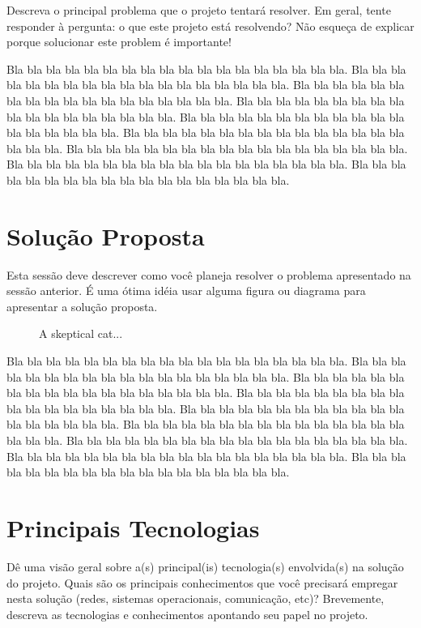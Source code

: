 \documentclass{acm_proc_article-sp}
\newcommand{\fig}[4][htb]{
  \begin{figure}[#1]
    {\centering{\texttt{[image: fig/\#2]}}\par}
    \caption{#3}
    \label{fig:#2}
  \end{figure}
}
\begin{document}
Descreva o principal problema que o projeto tentará resolver.
Em geral, tente responder à pergunta: o que este projeto está resolvendo?
Não esqueça de explicar porque solucionar este problem é importante!

Bla bla bla bla bla bla bla bla bla bla bla bla bla bla bla bla bla bla.
Bla bla bla bla bla bla bla bla bla bla bla bla bla bla bla bla bla bla.
Bla bla bla bla bla bla bla bla bla bla bla bla bla bla bla bla bla bla.
Bla bla bla bla bla bla bla bla bla bla bla bla bla bla bla bla bla bla.
Bla bla bla bla bla bla bla bla bla bla bla bla bla bla bla bla bla bla.
Bla bla bla bla bla bla bla bla bla bla bla bla bla bla bla bla bla bla.
Bla bla bla bla bla bla bla bla bla bla bla bla bla bla bla bla bla bla.
Bla bla bla bla bla bla bla bla bla bla bla bla bla bla bla bla bla bla.
Bla bla bla bla bla bla bla bla bla bla bla bla bla bla bla bla bla bla.

\section{Solução Proposta}

Esta sessão deve descrever como você planeja resolver o problema apresentado na sessão anterior.
É uma ótima idéia usar alguma figura ou diagrama para apresentar a solução proposta.

\fig{cat}{A skeptical cat...}{width=0.8\columnwidth}

Bla bla bla bla bla bla bla bla bla bla bla bla bla bla bla bla bla bla.
Bla bla bla bla bla bla bla bla bla bla bla bla bla bla bla bla bla bla.
Bla bla bla bla bla bla bla bla bla bla bla bla bla bla bla bla bla bla.
Bla bla bla bla bla bla bla bla bla bla bla bla bla bla bla bla bla bla.
Bla bla bla bla bla bla bla bla bla bla bla bla bla bla bla bla bla bla.
Bla bla bla bla bla bla bla bla bla bla bla bla bla bla bla bla bla bla.
Bla bla bla bla bla bla bla bla bla bla bla bla bla bla bla bla bla bla.
Bla bla bla bla bla bla bla bla bla bla bla bla bla bla bla bla bla bla.
Bla bla bla bla bla bla bla bla bla bla bla bla bla bla bla bla bla bla.

\section{Principais Tecnologias}

Dê uma visão geral sobre a(s) principal(is) tecnologia(s) envolvida(s) na solução do projeto.
Quais são os principais conhecimentos que você precisará empregar nesta solução (redes, sistemas operacionais, comunicação, etc)?
Brevemente, descreva as tecnologias e conhecimentos apontando seu papel no projeto.
\end{document}
